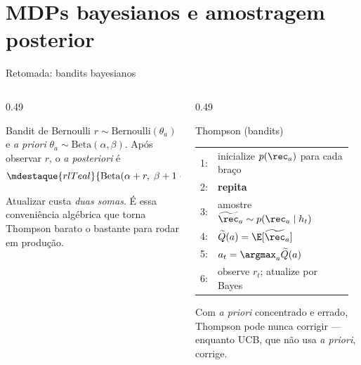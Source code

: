 \documentclass[aspectratio=169, 11pt]{beamer}
\makeatletter
\newcommand{\Qtil}{\widetilde{Q}}
\newcommand{\hist}{h_t}
\newcommand{\Bet}{\mathrm{Beta}}
\newcommand{\Ber}{\mathrm{Bernoulli}}
\newenvironment{pseudo}[1][0.93\linewidth]{%
  \small\setlength{\tabcolsep}{0pt}%
  \begin{tabular}{@{}r@{\hspace{0.55em}}p{#1}@{}}}%
  {\end{tabular}}
\newcommand{\pln}[1]{{\scriptsize\color{rlCinza}#1:}}
\newcommand{\ind}{\hspace*{1.1em}}
\makeatother
\begin{document}
\section{MDPs bayesianos e amostragem posterior}

\begin{frame}{Retomada: bandits bayesianos}
  \begin{columns}[T]
    \begin{column}{0.49\textwidth}
      \begin{defbox}{Bandit de Bernoulli}
        $r \sim \Ber(\theta_a)$ e \textit{a priori} $\theta_a \sim \Bet(\alpha,\beta)$.
        Após observar $r$, o \textit{a posteriori} é
        \[
          \mdestaque{rlTeal}{\Bet(\alpha + r,\; \beta + 1 - r)} .
        \]
      \end{defbox}
      \begin{ideiabox}
        Atualizar custa \emph{duas somas}. É essa conveniência algébrica que
        torna Thompson barato o bastante para rodar em produção.
      \end{ideiabox}
    \end{column}
    \begin{column}{0.49\textwidth}
      \begin{algbox}{Thompson (bandits)}
        \begin{pseudo}
          \pln{1} & inicialize $p(\rec_a)$ para cada braço \\
          \pln{2} & \textbf{repita} \\
          \pln{3} & \ind amostre $\widetilde{\rec}_a \sim p(\rec_a \mid \hist)$ \\
          \pln{4} & \ind $\Qtil(a) = \E[\widetilde{\rec}_a]$ \\
          \pln{5} & \ind $a_t = \argmax_{a} \Qtil(a)$ \\
          \pln{6} & \ind observe $r_t$; atualize por Bayes
        \end{pseudo}
      \end{algbox}
      \begin{alertabox}
        Com \textit{a priori} concentrado e errado, Thompson pode nunca corrigir ---
        enquanto UCB, que não usa \textit{a priori}, corrige.
      \end{alertabox}
    \end{column}
  \end{columns}
\end{frame}
\end{document}
